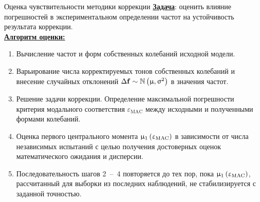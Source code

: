 \begin{frame}{Оценка чувствительности методики коррекции}
	\textbf{\underline{Задача}}: оценить влияние погрешностей в экспериментальном определении частот на устойчивость результата коррекции. \\ \vspace{0.5em}
	\textbf{\underline{Алгоритм оценки:}}
	\begin{enumerate}
		\item Вычисление частот и форм собственных колебаний исходной модели.
		\item Варьирование числа корректируемых тонов собственных колебаний и внесение случайных отклонений $ \Delta \mathbf{f} \sim \mathbb{N} \left( \upmu, \upsigma ^ 2 \right) $ в значения частот. 
		\item Решение задачи коррекции. Определение максимальной погрешности критерия модального соответствия $ \varepsilon_{\mathrm{MAC}} $ между исходными и полученными формами колебаний.
		\item Оценка первого центрального момента $ \upmu_1\left( \upvarepsilon_{\mathrm{MAC}} \right) $ в зависимости от числа независимых испытаний с целью получения достоверных оценок математического ожидания и дисперсии. 
		\item Последовательность шагов 2~--~4 повторяется до тех пор, пока $ \upmu_1\left( \upvarepsilon_{\mathrm{MAC}} \right) $, рассчитанный для выборки из последних наблюдений, не стабилизируется с заданной точностью.
	\end{enumerate}
\end{frame}

